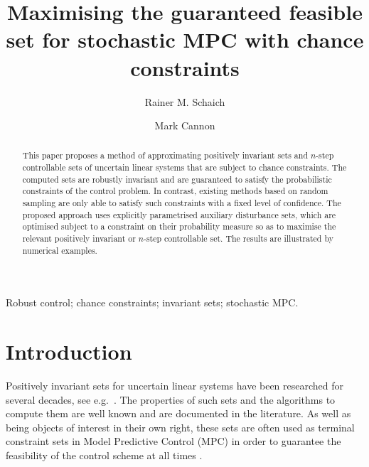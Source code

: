 \documentclass{ifacconf}
\begin{document}
\begin{frontmatter}

\title{Maximising the guaranteed feasible set for stochastic MPC with chance constraints}


\author{Rainer M. Schaich} 
\qquad\qquad\author{Mark Cannon}


\address{\mbox{Department of Engineering Science, University of Oxford, OX1 3PJ, UK} e-mail: \{rainer.schaich,mark.cannon\}@eng.ox.ac.uk}


          
\begin{keyword}                           %
Robust control; chance constraints;  invariant sets; stochastic MPC. 
\end{keyword}                             %


\begin{abstract}                          %
This paper proposes a method of approximating positively invariant sets and $n$-step controllable sets of uncertain linear systems that are subject to chance constraints. The computed sets are robustly invariant and are guaranteed to satisfy the probabilistic constraints of the control problem. In contrast, existing methods based on random sampling are only able to satisfy such constraints with a fixed level of confidence. The proposed approach uses explicitly parametrised auxiliary disturbance sets, which are optimised subject to a constraint on their probability measure so as to maximise the relevant positively invariant or $n$-step controllable set. The results are illustrated by numerical examples.
\end{abstract}

\end{frontmatter}


\section{Introduction}
%
%
Positively invariant sets for uncertain linear systems have been researched for several decades, see e.g.~\cite{Kolmanovsky:1995,Kolmanovsky:1998,blanchini:2007}.
%
The properties of such sets and the algorithms to compute them are well known and are documented in the literature.
%
As well as being objects of interest in their own right,
these sets are often used as terminal constraint sets in Model Predictive Control (MPC) in order to guarantee the feasibility of the control scheme at all times \citep[see e.g.][]{Mayne2014}.
%
\end{document}

